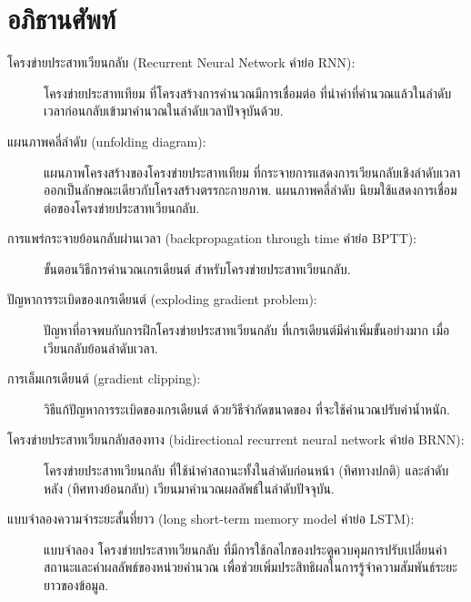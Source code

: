 \section{อภิธานศัพท์}

\begin{description}
		
\item[โครงข่ายประสาทเวียนกลับ (Recurrent Neural Network คำย่อ RNN):]
โครงข่ายประสาทเทียม ที่โครงสร้างการคำนวณมีการเชื่อมต่อ ที่นำค่าที่คำนวณแล้วในลำดับเวลาก่อนกลับเข้ามาคำนวณในลำดับเวลาปัจจุบันด้วย.

\item[แผนภาพคลี่ลำดับ (unfolding diagram):] 
แผนภาพโครงสร้างของโครงข่ายประสาทเทียม ที่กระจายการแสดงการเวียนกลับเชิงลำดับเวลา
ออกเป็นลักษณะเดียวกับโครงสร้างตรรกะกายภาพ.
แผนภาพคลี่ลำดับ นิยมใช้แสดงการเชื่อมต่อของโครงข่ายประสาทเวียนกลับ.

\item[การแพร่กระจายย้อนกลับผ่านเวลา (backpropagation through time คำย่อ BPTT):] 
ขั้นตอนวิธีการคำนวณเกรเดียนต์ สำหรับโครงข่ายประสาทเวียนกลับ.

\item[ปัญหาการระเบิดของเกรเดียนต์ (exploding gradient problem):]
ปัญหาที่อาจพบกับการฝึกโครงข่ายประสาทเวียนกลับ
ที่เกรเดียนต์มีค่าเพิ่มขั้นอย่างมาก เมื่อเวียนกลับย้อนลำดับเวลา.

\item[การเล็มเกรเดียนต์ (gradient clipping):]
วิธีแก้ปัญหาการระเบิดของเกรเดียนต์
ด้วยวิธีจำกัดขนาดของ  ที่จะใช้คำนวณปรับค่าน้ำหนัก.

\item[โครงข่ายประสาทเวียนกลับสองทาง (bidirectional recurrent neural network คำย่อ BRNN):]
โครงข่ายประสาทเวียนกลับ ที่ใช้นำค่าสถานะทั้งในลำดับก่อนหน้า (ทิศทางปกติ) และลำดับหลัง (ทิศทางย้อนกลับ) เวียนมาคำนวณผลลัพธ์ในลำดับปัจจุบัน.

\item[แบบจำลองความจำระยะสั้นที่ยาว (long short-term memory model คำย่อ LSTM):]
แบบจำลอง โครงข่ายประสาทเวียนกลับ
ที่มีการใช้กลไกของประตูควบคุมการปรับเปลี่ยนค่าสถานะและค่าผลลัพธ์ของหน่วยคำนวณ
เพื่อช่วยเพิ่มประสิทธิผลในการรู้จำความสัมพันธ์ระยะยาวของข้อมูล.


\end{description}
